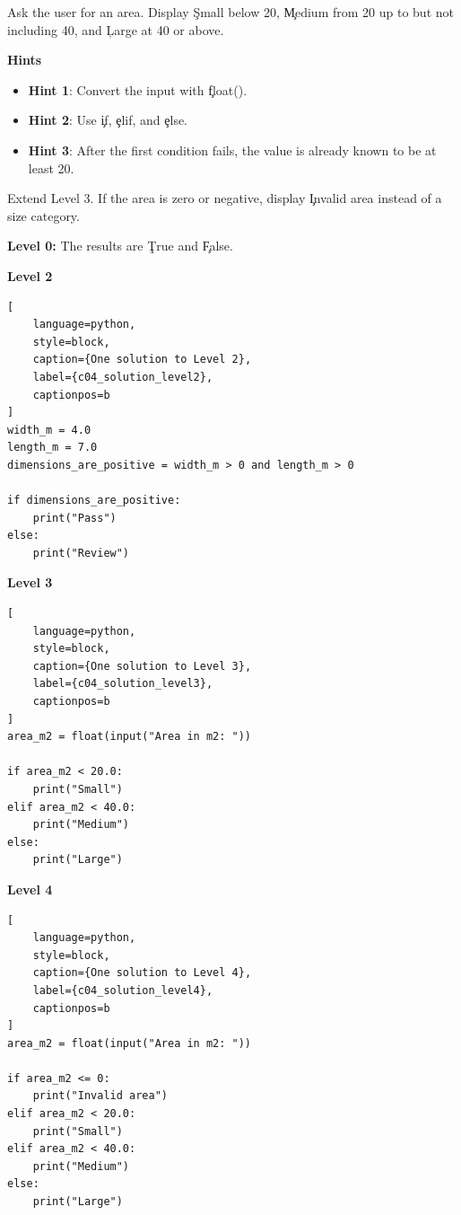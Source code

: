 
Ask the user for an area. Display \c{Small} below 20, \c{Medium} from 20 up to
but not including 40, and \c{Large} at 40 or above.

\textbf{Hints}
\begin{itemize}
    \item \textbf{Hint 1}: Convert the input with \c{float()}.
    \item \textbf{Hint 2}: Use \c{if}, \c{elif}, and \c{else}.
    \item \textbf{Hint 3}: After the first condition fails, the value is already
          known to be at least 20.
\end{itemize}


Extend Level 3. If the area is zero or negative, display \c{Invalid area}
instead of a size category.


\textbf{Level 0:} The results are \c{True} and \c{False}.

\textbf{Level 2}

\begin{lstlisting}[
    language=python,
    style=block,
    caption={One solution to Level 2},
    label={c04_solution_level2},
    captionpos=b
]
width_m = 4.0
length_m = 7.0
dimensions_are_positive = width_m > 0 and length_m > 0

if dimensions_are_positive:
    print("Pass")
else:
    print("Review")
\end{lstlisting}

\textbf{Level 3}

\begin{lstlisting}[
    language=python,
    style=block,
    caption={One solution to Level 3},
    label={c04_solution_level3},
    captionpos=b
]
area_m2 = float(input("Area in m2: "))

if area_m2 < 20.0:
    print("Small")
elif area_m2 < 40.0:
    print("Medium")
else:
    print("Large")
\end{lstlisting}

\textbf{Level 4}

\begin{lstlisting}[
    language=python,
    style=block,
    caption={One solution to Level 4},
    label={c04_solution_level4},
    captionpos=b
]
area_m2 = float(input("Area in m2: "))

if area_m2 <= 0:
    print("Invalid area")
elif area_m2 < 20.0:
    print("Small")
elif area_m2 < 40.0:
    print("Medium")
else:
    print("Large")
\end{lstlisting}

